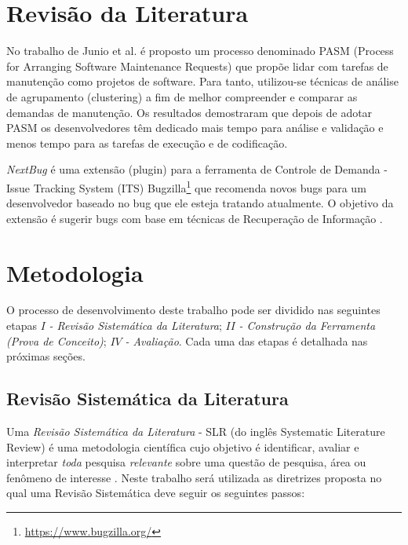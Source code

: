 \documentclass[msc,proposal,hidelot,hideabstract]{ppgccufmg} %
\begin{document}
\chapter{Revisão da Literatura}
\label{ch:revisao}

No trabalho de Junio et al. \cite{5741246} é proposto um processo denominado PASM (Process for Arranging
Software Maintenance Requests) que propõe lidar com tarefas de manutenção como
projetos de software. Para tanto, utilizou-se técnicas de análise de
agrupamento (clustering) a fim de melhor compreender e comparar as demandas de
manutenção. Os resultados demostraram que depois de adotar PASM os
desenvolvedores têm dedicado mais tempo para análise e validação e menos tempo
para as tarefas de execução e de codificação.

\textit{NextBug} \cite{101186} é uma extensão (plugin) para a ferramenta de Controle de Demanda -
Issue Tracking System (ITS) Bugzilla\footnote{\url{https://www.bugzilla.org/}}
que recomenda novos bugs para um desenvolvedor baseado no bug que ele esteja
tratando atualmente. O objetivo da extensão é sugerir bugs com base em técnicas de
Recuperação de Informação \cite{baeza1999modern}.


\chapter{Metodologia}
\label{ch:metodologia}

O processo de desenvolvimento deste trabalho pode ser dividido nas seguintes
etapas $I$\textit{ - Revisão Sistemática da Literatura}; $II$\textit{ - Construção da Ferramenta
  (Prova de Conceito)}; $IV$\textit{ - Avaliação}. Cada uma das etapas é detalhada nas próximas seções.

\section{Revisão Sistemática da Literatura}
\label{sec:revisao_sistematica}

Uma \textit{Revisão Sistemática da Literatura} - SLR (do inglês Systematic Literature Review) é uma
metodologia científica cujo objetivo é identificar, avaliar e interpretar
\textit{toda} pesquisa \textit{relevante} sobre uma questão de pesquisa, área
ou fenômeno de interesse \cite{keele2007guidelines,wohlin2012experimentation}. Neste trabalho
será utilizada as diretrizes proposta \cite{keele2007guidelines} no qual uma
Revisão Sistemática deve seguir os seguintes passos:
\end{document}
